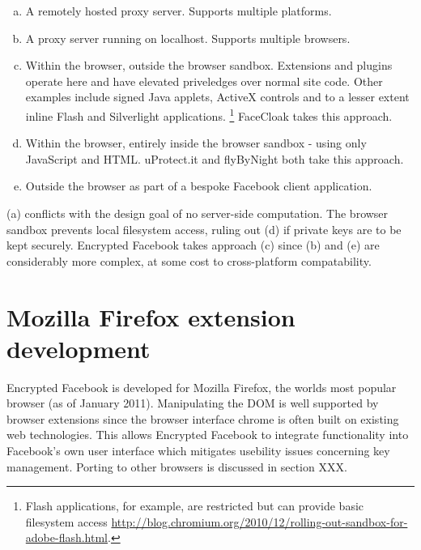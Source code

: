 \begin{enumerate}[(a)]
    
    \item A remotely hosted proxy server. Supports multiple platforms.
    
    \item A proxy server running on localhost. Supports multiple browsers.
    
    \item Within the browser, outside the browser sandbox. Extensions and plugins operate here and have elevated priveledges over normal site code. Other examples include signed Java applets, ActiveX controls and to a lesser extent inline Flash and Silverlight applications. \footnote{Flash applications, for example, are restricted but can provide basic filesystem access \url{http://blog.chromium.org/2010/12/rolling-out-sandbox-for-adobe-flash.html}.} FaceCloak takes this approach.
    
    \item Within the browser, entirely inside the browser sandbox - using only JavaScript and HTML. uProtect.it and flyByNight both take this approach.
    
    \item Outside the browser as part of a bespoke Facebook client application.
    
\end{enumerate}
   
(a) conflicts with the design goal of no server-side computation. The browser sandbox prevents local filesystem access, ruling out (d) if private keys are to be kept securely. Encrypted Facebook takes approach (c) since (b) and (e) are considerably more complex, at some cost to cross-platform compatability.



\FloatBarrier
\section{Mozilla Firefox extension development}

Encrypted Facebook is developed for Mozilla Firefox, the worlds most popular browser (as of January 2011). Manipulating the \ac{DOM} is well supported by browser extensions since the browser interface chrome is often built on existing web technologies. This allows Encrypted Facebook to integrate functionality into Facebook's own user interface which mitigates usebility issues concerning key management. Porting to other browsers is discussed in section XXX.

